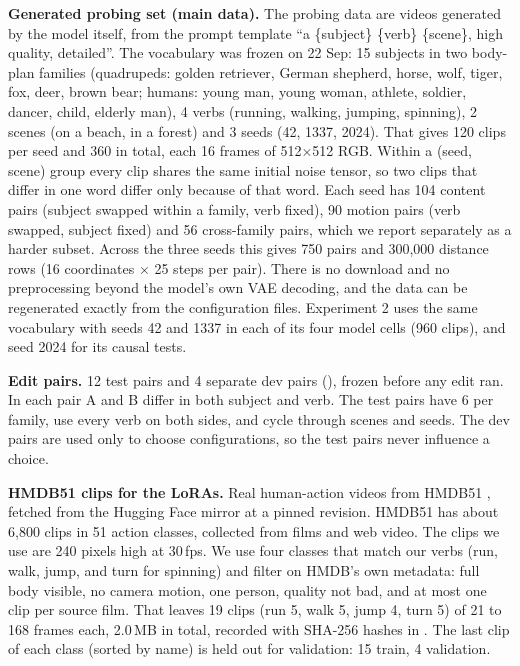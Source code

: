 \documentclass[twoside,english]{article}
\begin{document}
\textbf{Generated probing set (main data).} The probing data are videos generated by the model itself,
from the prompt template ``a \{subject\} \{verb\} \{scene\}, high quality, detailed''. The vocabulary was
frozen on 22 Sep: 15 subjects in two body-plan families (quadrupeds: golden retriever, German shepherd,
horse, wolf, tiger, fox, deer, brown bear; humans: young man, young woman, athlete, soldier, dancer,
child, elderly man), 4 verbs (running, walking, jumping, spinning), 2 scenes (on a beach, in a forest)
and 3 seeds (42, 1337, 2024). That gives 120 clips per seed and 360 in total, each 16 frames of
512$\times$512 RGB. Within a (seed, scene) group every clip shares the same initial noise tensor, so two
clips that differ in one word differ only because of that word. Each seed has 104 content pairs (subject
swapped within a family, verb fixed), 90 motion pairs (verb swapped, subject fixed) and 56 cross-family
pairs, which we report separately as a harder subset. Across the three seeds this gives 750 pairs and
300{,}000 distance rows (16 coordinates $\times$ 25 steps per pair). There is no download and no
preprocessing beyond the model's own VAE decoding, and the data can be regenerated exactly from the
configuration files. Experiment 2 uses the same vocabulary with seeds 42 and 1337 in each of its four
model cells (960 clips), and seed 2024 for its causal tests.

\textbf{Edit pairs.} 12 test pairs and 4 separate dev pairs (), frozen before
any edit ran. In each pair A and B differ in both subject and verb. The test pairs have 6 per family, use
every verb on both sides, and cycle through scenes and seeds. The dev pairs are used only to choose
configurations, so the test pairs never influence a choice.

\textbf{HMDB51 clips for the LoRAs.} Real human-action videos from HMDB51 \citep{kuehne2011hmdb}, fetched
from the Hugging Face mirror  \citep{hf_hmdb} at a pinned revision. HMDB51 has about
6{,}800 clips in 51 action classes, collected from films and web video. The clips we use are 240 pixels
high at 30\,fps. We use four classes that match our verbs (run, walk, jump, and turn for spinning) and
filter on HMDB's own metadata: full body visible, no camera motion, one person, quality not bad, and at
most one clip per source film. That leaves 19 clips (run 5, walk 5, jump 4, turn 5) of 21 to 168 frames
each, 2.0\,MB in total, recorded with SHA-256 hashes in . The last clip
of each class (sorted by name) is held out for validation: 15 train, 4 validation.
\end{document}
